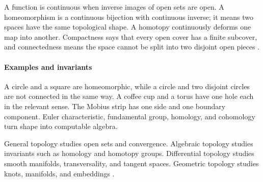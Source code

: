 A function is continuous when inverse images of open sets are open. A homeomorphism is a continuous bijection with continuous inverse; it means two spaces have the same topological shape. A homotopy continuously deforms one map into another. Compactness says that every open cover has a finite subcover, and connectedness means the space cannot be split into two disjoint open pieces \cite{topology_ref2}.

\paragraph{Examples and invariants}
A circle and a square are homeomorphic, while a circle and two disjoint circles are not connected in the same way. A coffee cup and a torus have one hole each in the relevant sense. The Mobius strip has one side and one boundary component. Euler characteristic, fundamental group, homology, and cohomology turn shape into computable algebra.

General topology studies open sets and convergence. Algebraic topology studies invariants such as homology and homotopy groups. Differential topology studies smooth manifolds, transversality, and tangent spaces. Geometric topology studies knots, manifolds, and embeddings \cite{topology_ref3}.


